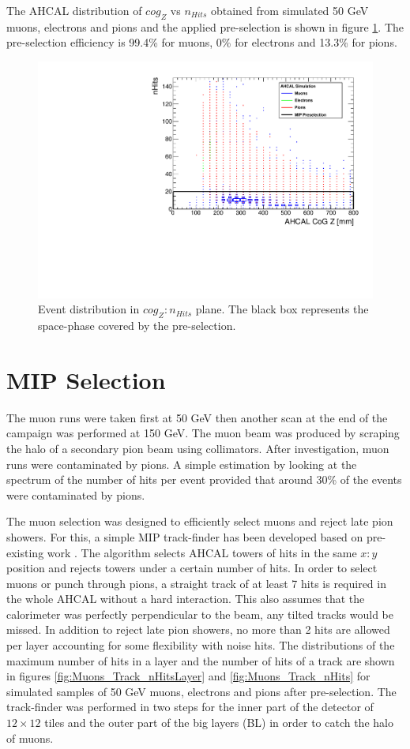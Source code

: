 The AHCAL distribution of $cog_Z$ vs $n_{Hits}$ obtained from simulated 50 GeV muons, electrons and pions and the applied pre-selection is shown in figure \ref{fig:Muons_CoGZ_nHits}. The pre-selection efficiency is 99.4\% for muons, 0\% for electrons and 13.3\% for pions.

\begin{figure}[htbp!]
	\centering
	\includegraphics[width=0.7\linewidth]{../Thesis_Plots/Timing/Muons/Plots/SelectionCut_nHitsCoGZ_Muons}
	\caption{Event distribution in $cog_Z:n_{Hits}$ plane. The black box represents the space-phase covered by the pre-selection.} \label{fig:Muons_CoGZ_nHits}
\end{figure}

\section{MIP Selection}
\label{subsec:Muon_sel}

The muon runs were taken first at 50 GeV then another scan at the end of the campaign was performed at 150 GeV. The muon beam was produced by scraping the halo of a secondary pion beam using collimators. After investigation, muon runs were contaminated by pions. A simple estimation by looking at the spectrum of the number of hits per event provided that around 30\% of the events were contaminated by pions.

The muon selection was designed to efficiently select muons and reject late pion showers. For this, a simple MIP track-finder has been developed based on pre-existing work \cite{Hartbrich:2016bbz}. The algorithm selects AHCAL towers of hits in the same $x:y$ position and rejects towers under a certain number of hits. In order to select muons or punch through pions, a straight track of at least 7 hits is required in the whole AHCAL without a hard interaction. This also assumes that the calorimeter was perfectly perpendicular to the beam, any tilted tracks would be missed. In addition to reject late pion showers, no more than 2 hits are allowed per layer accounting for some flexibility with noise hits. The distributions of the maximum number of hits in a layer and the number of hits of a track are shown in figures \ref{fig:Muons_Track_nHitsLayer} and \ref{fig:Muons_Track_nHits} for simulated samples of 50 GeV muons, electrons and pions after pre-selection. The track-finder was performed in two steps for the inner part of the detector of $12 \times 12$ tiles and the outer part of the big layers (BL) in order to catch the halo of muons.

